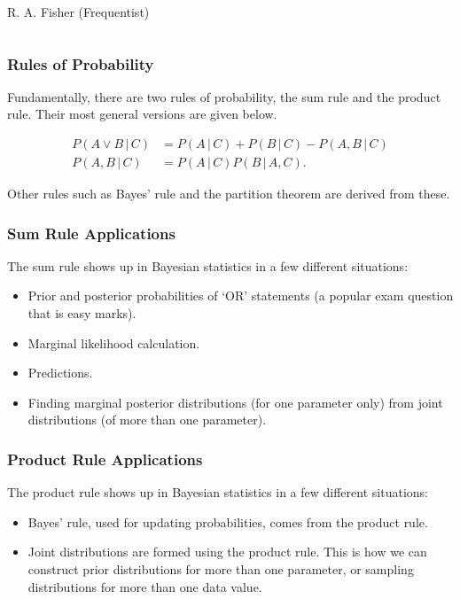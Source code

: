 \documentclass{beamer}
\newcommand{\given}{\,|\,}
\begin{document}
\begin{frame}
\begin{columns}
        R. A. Fisher (Frequentist)
     \end{columns}


\end{frame}


\begin{frame}
\frametitle{Rules of Probability}
Fundamentally, there are two rules of probability, the sum rule and the
product rule. Their most general versions are given below.

\begin{align}
P(A \vee B \given C) &= P(A \given C) + P(B \given C) - P(A, B \given C) \\
P(A, B \given C) &= P(A \given C)P(B \given A, C).
\end{align}\pause

Other rules such as Bayes' rule and the partition theorem are derived from
these.


\end{frame}


\begin{frame}
\frametitle{Sum Rule Applications}
The sum rule shows up in Bayesian statistics in a few different situations:\pause

\begin{itemize}
\item Prior and posterior probabilities of `OR' statements (a popular exam
question that is easy marks).\pause
\item Marginal likelihood calculation.\pause
\item Predictions.\pause
\item Finding marginal posterior distributions (for one parameter only)
from joint distributions (of more than one parameter).
\end{itemize}


\end{frame}


\begin{frame}
\frametitle{Product Rule Applications}
The product rule shows up in Bayesian statistics in a few different situations:\pause

\begin{itemize}
\item Bayes' rule, used for updating probabilities, comes from the product
rule.\pause
\item Joint distributions are formed using the product rule. This is how
we can construct prior distributions for more than one parameter, or
sampling distributions for more than one data value.
\end{itemize}


\end{frame}
\end{document}
